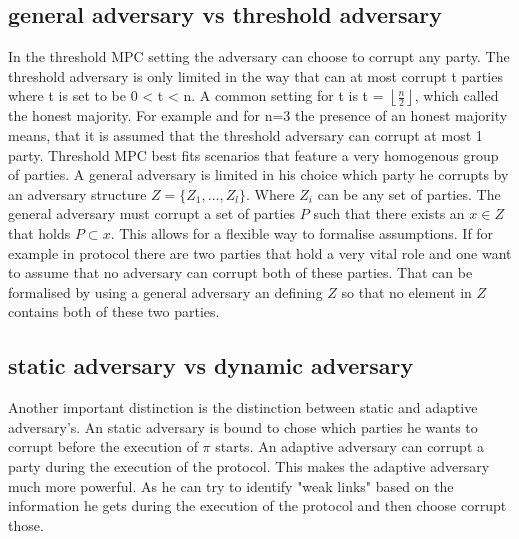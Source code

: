 \subsection{general adversary vs threshold adversary}
In the threshold MPC setting the adversary can choose to corrupt any party. The threshold adversary is only limited in the way that can at most corrupt t parties where t is set to be 0 < t < n. A common setting for t is t = $\left \lfloor{ \frac{n}{2} }\right \rfloor  $, which called the honest majority. For example and for n=3 the presence of an honest majority means, that it is assumed that the threshold adversary can corrupt at most 1 party. Threshold MPC best fits scenarios that feature a very homogenous group of parties. A general adversary is limited in his choice which party he corrupts by an adversary structure  
$ Z = \{ Z_1, \dots, Z_l  \} $. Where $ Z_i $ can be any set of parties. The general adversary must corrupt a set of parties  $ P $ such that there exists an $ x \in Z $ that holds $ P \subset x $. This allows for a flexible way to formalise assumptions. If for example in protocol there are two parties that hold a very vital role and one want to assume that no adversary can corrupt both of these parties. That can be formalised by using a general adversary an defining $ Z $ so that no element in  $Z $ contains both of these two parties.  
 

\subsection{static adversary vs dynamic adversary}
Another important distinction is the distinction between static and adaptive adversary's. An static adversary is bound to chose which parties he wants to corrupt before the execution of $ \pi $ starts. An adaptive adversary can corrupt a party during the execution of the protocol. This makes the adaptive adversary much more powerful. As he can try to identify "weak links" based on the information he gets during the execution of the protocol and then choose corrupt those.   

